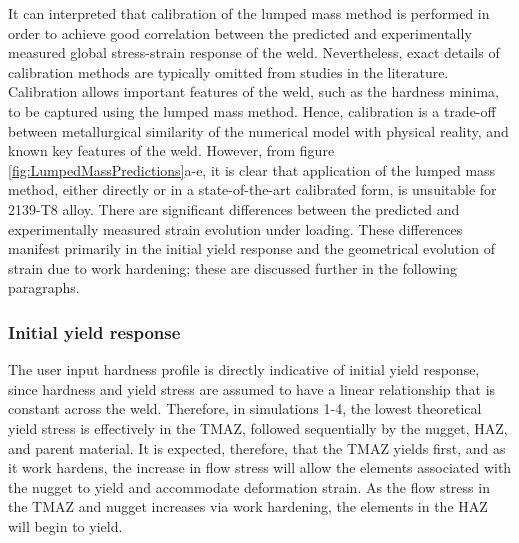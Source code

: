 It can interpreted that calibration of the lumped mass method is performed in order to achieve good correlation between the predicted and experimentally measured global stress-strain response of the weld. Nevertheless, exact details of calibration methods are typically omitted from studies in the literature. Calibration allows important features of the weld, such as the hardness minima, to be captured using the lumped mass method. Hence, calibration is a trade-off between metallurgical similarity of the numerical model with physical reality, and known key features of the weld. However, from figure \ref{fig:LumpedMassPredictions}a-e, it is clear that application of the lumped mass method, either directly or in a state-of-the-art calibrated form, is unsuitable for 2139-T8 alloy. There are significant differences between the predicted and experimentally measured strain evolution under loading. These differences manifest primarily in the initial yield response and the geometrical evolution of strain due to work hardening; these are discussed further in the following paragraphs.

\subsubsection{Initial yield response}
\label{SMDModellingstudyResultsSims1to4Correction1Initialyielding}
The user input hardness profile is directly indicative of initial yield response, since hardness and yield stress are assumed to have a linear relationship that is constant across the weld. Therefore, in simulations 1-4, the lowest theoretical yield stress is effectively in the TMAZ, followed sequentially by the nugget, HAZ, and parent material. It is expected, therefore, that the TMAZ yields first, and as it work hardens, the increase in flow stress will allow the elements associated with the nugget to yield and accommodate deformation strain. As the flow stress in the TMAZ and nugget increases via work hardening, the elements in the HAZ will begin to yield. 

